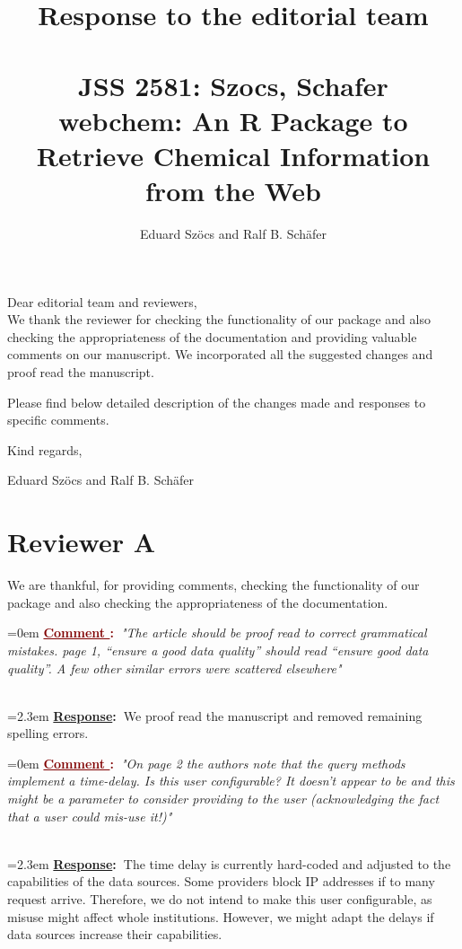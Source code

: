 \documentclass[12pt]{article}
\newcounter{cN}
\newcommand{\comment}[1]{
	\vspace{2em} 
	\refstepcounter{cN} %
	\noindent \hangindent=0em \textbf{\textcolor{Maroon}{\uline{Comment \thecN}:~}}\emph{"#1"}
	}
\newcommand{\response}[1]{
	\\[0.25em] 
	\hangindent=2.3em \textbf{\textcolor{NavyBlue}{\uline{Response}:~}}#1 
	}
\begin{document}
\title{Response to the editorial team\\~\\JSS 2581: Szocs, Schafer \\ webchem: An R Package to Retrieve Chemical Information from the Web}

\author{Eduard Szöcs and Ralf B. Schäfer}

\maketitle
\noindent Dear editorial team and reviewers,\\

\noindent
We thank the reviewer for checking the functionality of our package and also checking the appropriateness of the documentation and providing valuable comments on our manuscript.
We incorporated all the suggested changes and proof read the manuscript.

\noindent
Please find below detailed description of the changes made and responses to specific comments. 


\vspace{2em}
\hfill Kind regards,

\hfill Eduard Szöcs and Ralf B. Schäfer
\newpage




\section{Reviewer A}

We are thankful, for providing comments, checking the functionality of our package and also checking the appropriateness of the documentation.

\comment{The article should be proof read to correct grammatical mistakes. page 1, “ensure a good data quality” should read “ensure good data quality”. A few other similar errors were scattered elsewhere}
\response{We proof read the manuscript and removed remaining spelling errors.}

\comment{On page 2 the authors note that the query methods implement a time-delay. Is this user configurable? It doesn’t appear to be and this might be a parameter to consider providing to the user (acknowledging the fact that a user could mis-use it!)}
\response{The time delay is currently hard-coded and adjusted to the capabilities of the data sources.
Some providers block IP addresses if to many request arrive.
Therefore, we do not intend to make this user configurable, as misuse might affect whole institutions.
However, we might adapt the delays if data sources increase their capabilities. 
}
\end{document}
